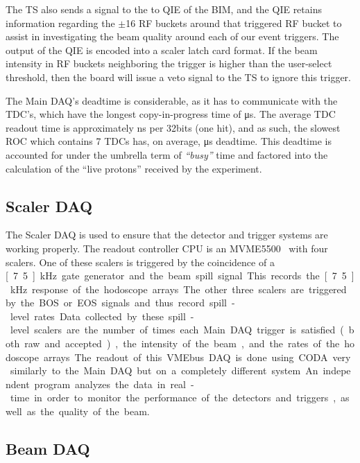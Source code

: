 The TS also sends a signal to the to QIE of the BIM, and the QIE retains information regarding the $\pm$16 RF buckets around that triggered RF bucket to assist in investigating the beam quality around each of our event triggers. The output of the QIE is encoded into a scaler latch card format. If the beam intensity in RF buckets neighboring the trigger is higher than the user-select threshold, then the board will issue a veto signal to the TS to ignore this trigger.

The Main DAQ's deadtime is considerable, as it has to communicate with the TDC's, which have the longest copy-in-progress time of \unit[32]{\us}. The average TDC readout time is approximately \unit[300]{ns} per 32bits (one hit), and as such, the slowest ROC which contains 7 TDCs has, on average, \unit[150]{\us} deadtime. This deadtime is accounted for under the umbrella term of \emph{``busy''} time and factored into the calculation of the ``live protons'' received by the experiment.

\subsection{Scaler DAQ}

The Scaler DAQ is used to ensure that the detector and trigger systems are working properly. The readout controller CPU is an MVME5500~\cite{mvme:scaler} with four scalers. One of these scalers is triggered by the coincidence of a \unit[7.5]{kHz} gate generator and the beam spill signal. This records the \unit[7.5]{kHz} response of the hodoscope arrays. The other three scalers are triggered by the BOS or EOS signals and thus record spill-level rates. Data collected by these spill-level scalers are the number of times each Main DAQ trigger is satisfied (both raw and accepted), the intensity of the beam, and the rates of the hodoscope arrays. The readout of this VMEbus DAQ is done using CODA very similarly to the Main DAQ but on a completely different system. An independent program analyzes the data in real-time in order to monitor the performance of the detectors and triggers, as well as the quality of the beam. 


\subsection{Beam DAQ}

